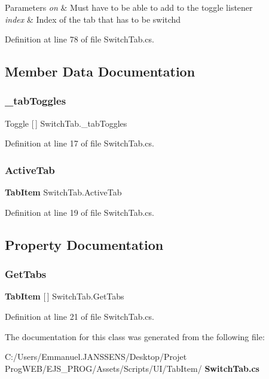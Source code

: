 \begin{DoxyParams}{Parameters}
{\em on} & Must have to be able to add to the toggle listener\\
\hline
{\em index} & Index of the tab that has to be switchd\\
\hline
\end{DoxyParams}


Definition at line 78 of file Switch\+Tab.\+cs.



\subsection{Member Data Documentation}
\mbox{\label{class_switch_tab_af6a4de43e737d6dd7401d7c466721055}} 
\subsubsection{\+\_\+tab\+Toggles}
{\footnotesize\ttfamily Toggle [$\,$] Switch\+Tab.\+\_\+tab\+Toggles}



Definition at line 17 of file Switch\+Tab.\+cs.

\mbox{\label{class_switch_tab_afdacc08f5d7486d7fbe3263938189aee}} 
\subsubsection{Active\+Tab}
{\footnotesize\ttfamily \textbf{ Tab\+Item} Switch\+Tab.\+Active\+Tab}



Definition at line 19 of file Switch\+Tab.\+cs.



\subsection{Property Documentation}
\mbox{\label{class_switch_tab_a6b4738b66d223e5a0ae69c55d83d4080}} 
\subsubsection{Get\+Tabs}
{\footnotesize\ttfamily \textbf{ Tab\+Item} [$\,$] Switch\+Tab.\+Get\+Tabs\hspace{0.3cm}{\ttfamily [get]}}



Definition at line 21 of file Switch\+Tab.\+cs.



The documentation for this class was generated from the following file\+:\begin{DoxyCompactItemize}
\item 
C\+:/\+Users/\+Emmanuel.\+J\+A\+N\+S\+S\+E\+N\+S/\+Desktop/\+Projet Prog\+W\+E\+B/\+E\+J\+S\+\_\+\+P\+R\+O\+G/\+Assets/\+Scripts/\+U\+I/\+Tab\+Item/\textbf{ Switch\+Tab.\+cs}\end{DoxyCompactItemize}
